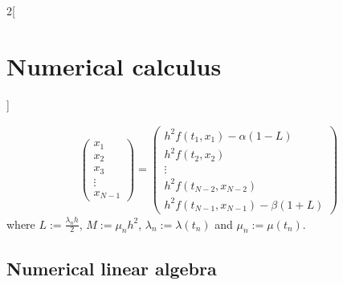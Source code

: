 \documentclass[../../../main_math.tex]{subfiles}
\begin{document}
\begin{multicols}{2}[\section{Numerical calculus}]
\begin{definition}
\begin{multline*}
\begin{pmatrix}
        x_1 \\ x_2 \\ x_3 \\ \vdots \\ x_{N-1}
      \end{pmatrix}=
      \begin{pmatrix}
        h^2f(t_1, x_1)-\alpha\left(1-L\right) \\ h^2f(t_2, x_2)  \\ \vdots\\ h^2f(t_{N-2}, x_{N-2}) \\ h^2f(t_{N-1}, x_{N-1})-\beta\left(1+L\right)
      \end{pmatrix}
    \end{multline*}
    where $L:=\frac{\lambda_n h}{2}$, $M:=\mu_n h^2$, $\lambda_n:=\lambda(t_n)$ and $\mu_n:=\mu(t_n)$.
  \end{definition}


  \subsection{Numerical linear algebra}

\end{multicols}
\end{document}
